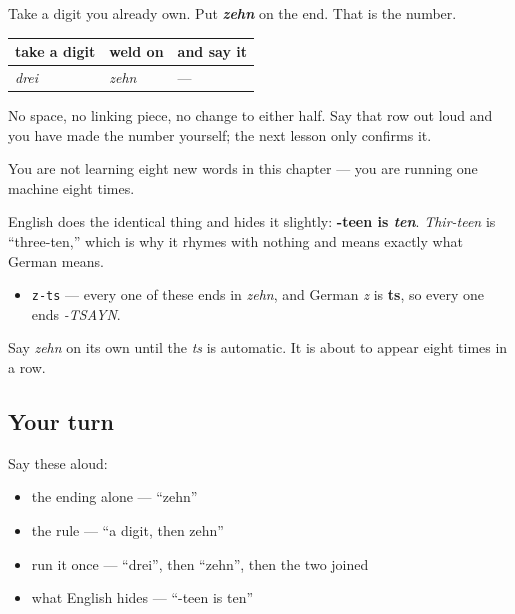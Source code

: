 \begin{grammarlens}[title={Grammar Lens: a digit, then zehn}]
Take a digit you already own. Put \emph{\textbf{zehn}} on the end. That is the number.

\noindent
\begin{tabularx}{\linewidth}{@{}>{\raggedright\arraybackslash}X>{\raggedright\arraybackslash}X>{\raggedright\arraybackslash}X@{}}
\toprule
\textbf{take a digit} & \textbf{weld on} & \textbf{and say it} \\
\midrule
\emph{drei} & \emph{zehn} & — \\
\bottomrule
\end{tabularx}

No space, no linking piece, no change to either half. Say that row out loud and you have made the number yourself; the next lesson only confirms it.

You are not learning eight new words in this chapter — you are running one machine eight times.

English does the identical thing and hides it slightly: \textbf{-teen is \emph{ten}}. \emph{Thir-teen} is \textquotedblleft{}three-ten,\textquotedblright{} which is why it rhymes with nothing and means exactly what German means.
\end{grammarlens}

\begin{sounds}
\begin{itemize}
\raggedright
  \item \texttt{z-ts} — every one of these ends in \emph{zehn}, and German \emph{z} is \textbf{ts}, so every one ends \emph{-TSAYN}.
\end{itemize}

Say \emph{zehn} on its own until the \emph{ts} is automatic. It is about to appear eight times in a row.
\end{sounds}

\subsection*{Your turn}
Say these aloud:

\begin{itemize}
\raggedright
  \item the ending alone — \textquotedblleft{}zehn\textquotedblright{}
  \item the rule — \textquotedblleft{}a digit, then zehn\textquotedblright{}
  \item run it once — \textquotedblleft{}drei\textquotedblright{}, then \textquotedblleft{}zehn\textquotedblright{}, then the two joined
  \item what English hides — \textquotedblleft{}-teen is ten\textquotedblright{}
\end{itemize}

